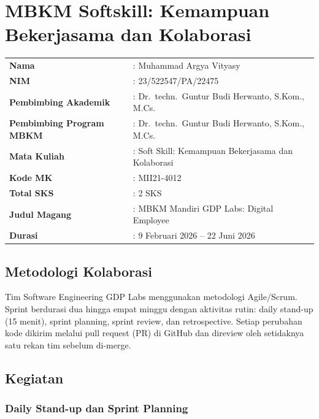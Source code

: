 \section{MBKM Softskill: Kemampuan Bekerjasama dan Kolaborasi}

\begin{table}[H]
    \centering
    \begin{tabular}{ll}
        \textbf{Nama} & : Muhammad Argya Vityasy \\
        \textbf{NIM} & : 23/522547/PA/22475 \\
        \textbf{Pembimbing Akademik} & : Dr.\ techn.\ Guntur Budi Herwanto, S.Kom., M.Cs. \\
        \textbf{Pembimbing Program MBKM} & : Dr.\ techn.\ Guntur Budi Herwanto, S.Kom., M.Cs. \\
        \textbf{Mata Kuliah} & : Soft Skill: Kemampuan Bekerjasama dan Kolaborasi \\
        \textbf{Kode MK} & : MII21-4012 \\
        \textbf{Total SKS} & : 2 SKS \\
        \textbf{Judul Magang} & : MBKM Mandiri GDP Labs: Digital Employee \\
        \textbf{Durasi} & : 9 Februari 2026 -- 22 Juni 2026 \\
    \end{tabular}
\end{table}

\subsection{Metodologi Kolaborasi}

Tim Software Engineering GDP Labs menggunakan metodologi Agile/Scrum. Sprint berdurasi dua hingga empat minggu dengan aktivitas rutin: daily stand-up (15 menit), sprint planning, sprint review, dan retrospective. Setiap perubahan kode dikirim melalui pull request (PR) di GitHub dan direview oleh setidaknya satu rekan tim sebelum di-merge.

\subsection{Kegiatan}

\subsubsection{Daily Stand-up dan Sprint Planning}

